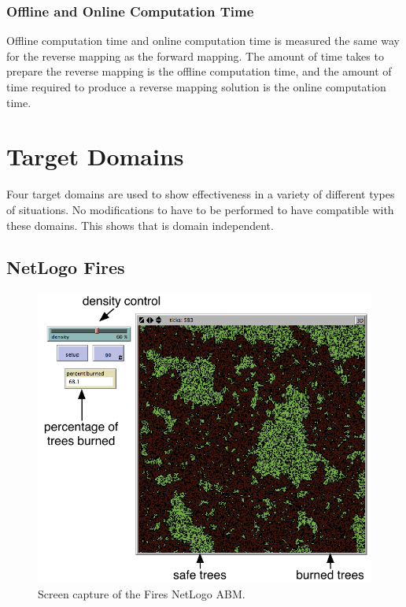   \subsubsection{Offline and Online Computation Time}
Offline computation time and online computation time is measured the same way for the reverse mapping as the forward mapping.
The amount of time \fw takes to prepare the reverse mapping is the offline computation time, and the amount of time required to produce a reverse mapping solution is the online computation time.





\section{Target Domains}\label{sec:tdomains}

Four target domains are used to show \fw effectiveness in a variety of different types of situations.
No modifications to \fw have to be performed to have \fw compatible with these domains.
This shows that \fw is domain independent.

 \subsection{NetLogo Fires}\label{sec:Fires}



\begin{figure}[ht]
\centering
\includegraphics[scale=1]{images/fires_ui.pdf}
\caption{Screen capture of the Fires NetLogo ABM.}
\label{fig:firesui}
\end{figure}

